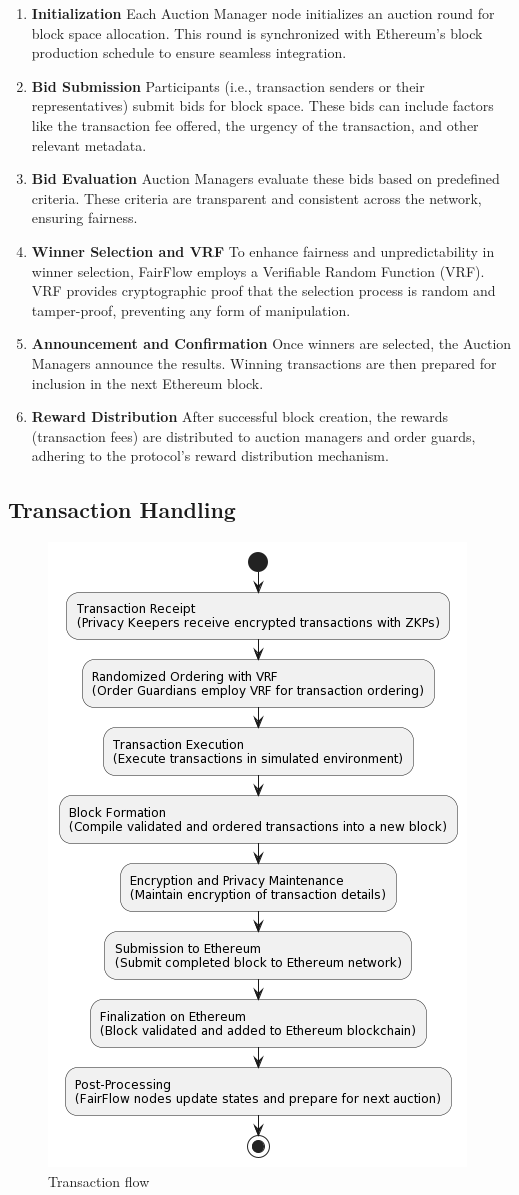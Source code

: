 \documentclass{article}
\begin{document}
\begin{enumerate}
    \item \textbf{Initialization} Each Auction Manager node initializes an auction round for block space allocation. This round is synchronized with Ethereum's block production schedule to ensure seamless integration.
    \item \textbf{Bid Submission} Participants (i.e., transaction senders or their representatives) submit bids for block space. These bids can include factors like the transaction fee offered, the urgency of the transaction, and other relevant metadata.
    \item \textbf{Bid Evaluation} Auction Managers evaluate these bids based on predefined criteria. These criteria are transparent and consistent across the network, ensuring fairness.
    \item \textbf{Winner Selection and VRF} To enhance fairness and unpredictability in winner selection, FairFlow employs a Verifiable Random Function (VRF). VRF provides cryptographic proof that the selection process is random and tamper-proof, preventing any form of manipulation.
    \item \textbf{Announcement and Confirmation} Once winners are selected, the Auction Managers announce the results. Winning transactions are then prepared for inclusion in the next Ethereum block.
    \item \textbf{Reward Distribution} After successful block creation, the rewards (transaction fees) are distributed to auction managers and order guards, adhering to the protocol’s reward distribution mechanism.
\end{enumerate}

\subsection{Transaction Handling}

\begin{figure}[h]
    \centering
    \includegraphics[width=0.4\linewidth]{diagram_freeflow_1.png}
    \caption{Transaction flow}
    \label{fig:enter-label}
\end{figure}
\end{document}
